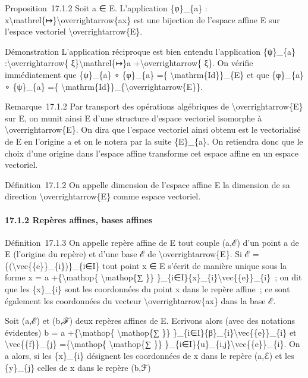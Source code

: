 \documentclass[]{article}
\begin{document}
Proposition~17.1.2 Soit a ∈ E. L'application \{φ\}\_\{a\} :
x\textbackslash{}mathrel\{↦\}\textbackslash{}overrightarrow\{ax\} est
une bijection de l'espace affine E sur l'espace vectoriel
\textbackslash{}overrightarrow\{E\}.

Démonstration L'application réciproque est bien entendu l'application
\{ψ\}\_\{a\} :\textbackslash{}overrightarrow\{
ξ\}\textbackslash{}mathrel\{↦\}a +\textbackslash{}overrightarrow\{ ξ\}.
On vérifie immédiatement que \{ψ\}\_\{a\} ∘ \{φ\}\_\{a\} =\{
\textbackslash{}mathrm\{Id\}\}\_\{E\} et que \{φ\}\_\{a\} ∘ \{ψ\}\_\{a\}
=\{
\textbackslash{}mathrm\{Id\}\}\_\{\textbackslash{}overrightarrow\{E\}\}.

Remarque~17.1.2 Par transport des opérations algébriques de
\textbackslash{}overrightarrow\{E\} sur E, on munit ainsi E d'une
structure d'espace vectoriel isomorphe à
\textbackslash{}overrightarrow\{E\}. On dira que l'espace vectoriel
ainsi obtenu est le vectorialisé de E en l'origine a et on le notera par
la suite \{E\}\_\{a\}. On retiendra donc que le choix d'une origine dans
l'espace affine transforme cet espace affine en un espace vectoriel.

Définition~17.1.2 On appelle dimension de l'espace affine E la dimension
de sa direction \textbackslash{}overrightarrow\{E\} comme espace
vectoriel.

\paragraph{17.1.2 Repères affines, bases affines}

Définition~17.1.3 On appelle repère affine de E tout couple (a,ℰ) d'un
point a de E (l'origine du repère) et d'une base ℰ de
\textbackslash{}overrightarrow\{E\}. Si ℰ =
\{(\textbackslash{}vec\{\{e\}\}\_\{i\})\}\_\{i∈I\} tout point x ∈ E
s'écrit de manière unique sous la forme x = a
+\{\textbackslash{}mathop\{ \textbackslash{}mathop\{∑ \}\}
\}\_\{i∈I\}\{x\}\_\{i\}\textbackslash{}vec\{\{e\}\}\_\{i\}~; on dit que
les \{x\}\_\{i\} sont les coordonnées du point x dans le repère affine~;
ce sont également les coordonnées du vecteur
\textbackslash{}overrightarrow\{ax\} dans la base ℰ.

Soit (a,ℰ) et (b,ℱ) deux repères affines de E. Ecrivons alors (avec des
notations évidentes) b = a +\{\textbackslash{}mathop\{
\textbackslash{}mathop\{∑ \}\}
\}\_\{i∈I\}\{β\}\_\{i\}\textbackslash{}vec\{\{e\}\}\_\{i\} et
\textbackslash{}vec\{\{f\}\}\_\{j\} =\{\textbackslash{}mathop\{
\textbackslash{}mathop\{∑ \}\}
\}\_\{i∈I\}\{u\}\_\{i,j\}\textbackslash{}vec\{\{e\}\}\_\{i\}. On a
alors, si les \{x\}\_\{i\} désignent les coordonnées de x dans le repère
(a,ℰ) et les \{y\}\_\{j\} celles de x dans le repère (b,ℱ)
\end{document}
